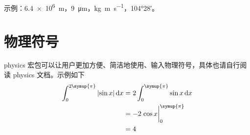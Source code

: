 示例：\SI{6.4e6}{m}，\SI{9}{\micro\meter}，\si{kg.m.s^{-1}}，\ang{104;28;}。

\section{物理符号}
physics 宏包可以让用户更加方便、简洁地使用、输入物理符号，具体也请自行阅读 physics 文档。示例如下
\begin{equation}
  \begin{aligned}
    \int_0^{2\symup{\pi}} \abs{\sin{x}} \dd{x} & = 2 \int_0^{\symup{\pi}} \sin{x} \dd{x} \\
                                                      & = -2 \eval{\cos{x}}_0^{\symup{\pi}}     \\
                                                      & = 4
  \end{aligned}
\end{equation}